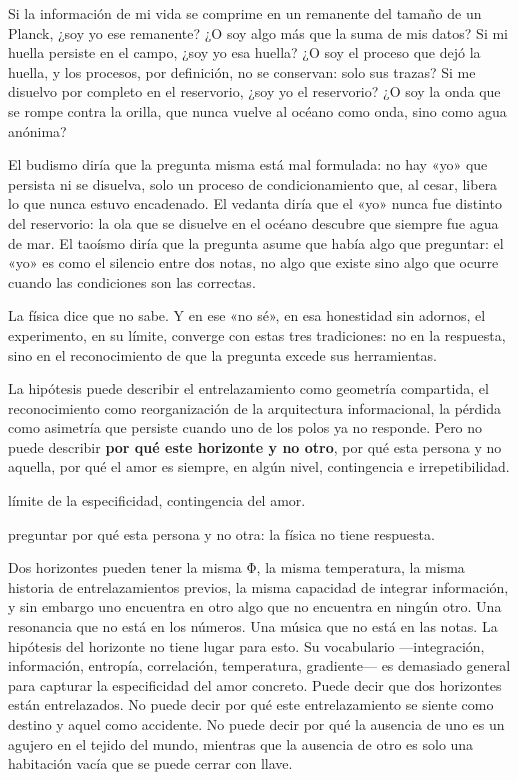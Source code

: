 Si la información de mi vida se comprime en un remanente del tamaño de un Planck, ¿soy yo ese remanente? ¿O soy algo más que la suma de mis datos? Si mi huella persiste en el campo, ¿soy yo esa huella? ¿O soy el proceso que dejó la huella, y los procesos, por definición, no se conservan: solo sus trazas? Si me disuelvo por completo en el reservorio, ¿soy yo el reservorio? ¿O soy la onda que se rompe contra la orilla, que nunca vuelve al océano como onda, sino como agua anónima?

El budismo diría que la pregunta misma está mal formulada: no hay «yo» que persista ni se disuelva, solo un proceso de condicionamiento que, al cesar, libera lo que nunca estuvo encadenado. El vedanta diría que el «yo» nunca fue distinto del reservorio: la ola que se disuelve en el océano descubre que siempre fue agua de mar. El taoísmo diría que la pregunta asume que había algo que preguntar: el «yo» es como el silencio entre dos notas, no algo que existe sino algo que ocurre cuando las condiciones son las correctas.

La física dice que no sabe. Y en ese «no sé», en esa honestidad sin adornos, el experimento, en su límite, converge con estas tres tradiciones: no en la respuesta, sino en el reconocimiento de que la pregunta excede sus herramientas.

\noindent La hipótesis puede describir el entrelazamiento como geometría compartida, el reconocimiento como reorganización de la arquitectura informacional, la pérdida como asimetría que persiste cuando uno de los polos ya no responde. Pero no puede describir \textbf{por qué este horizonte y no otro}, por qué esta persona y no aquella, por qué el amor es siempre, en algún nivel, contingencia e irrepetibilidad.

\begin{fisica}
 límite de la especificidad, contingencia del amor.

 preguntar por qué esta persona y no otra: la física no tiene respuesta.
\end{fisica}
Dos horizontes pueden tener la misma Φ, la misma temperatura, la misma historia de entrelazamientos previos, la misma capacidad de integrar información, y sin embargo uno encuentra en otro algo que no encuentra en ningún otro. Una resonancia que no está en los números. Una música que no está en las notas. La hipótesis del horizonte no tiene lugar para esto. Su vocabulario —integración, información, entropía, correlación, temperatura, gradiente— es demasiado general para capturar la especificidad del amor concreto. Puede decir que dos horizontes están entrelazados. No puede decir por qué este entrelazamiento se siente como destino y aquel como accidente. No puede decir por qué la ausencia de uno es un agujero en el tejido del mundo, mientras que la ausencia de otro es solo una habitación vacía que se puede cerrar con llave.

